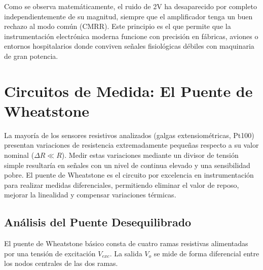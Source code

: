 %
Como se observa matemáticamente, el ruido de \unit{2}{V} ha desaparecido por completo independientemente de su magnitud, siempre que el amplificador tenga un buen rechazo al modo común (CMRR). Este principio es el que permite que la instrumentación electrónica moderna funcione con precisión en fábricas, aviones o entornos hospitalarios donde conviven señales fisiológicas débiles con maquinaria de gran potencia.




\section{Circuitos de Medida: El Puente de Wheatstone}\label{sec:puente_wheatstone}

La mayoría de los sensores resistivos analizados (galgas extensiométricas, Pt100) presentan variaciones de resistencia extremadamente pequeñas respecto a su valor nominal ($\Delta R \ll R$). Medir estas variaciones mediante un divisor de tensión simple resultaría en señales con un nivel de continua elevado y una sensibilidad pobre. El puente de Wheatstone es el circuito por excelencia en instrumentación para realizar medidas diferenciales, permitiendo eliminar el valor de reposo, mejorar la linealidad y compensar variaciones térmicas.



\subsection{Análisis del Puente Desequilibrado}

El puente de Wheatstone básico consta de cuatro ramas resistivas alimentadas por una tensión de excitación $V_{exc}$. La salida $V_o$ se mide de forma diferencial entre los nodos centrales de las dos ramas.

